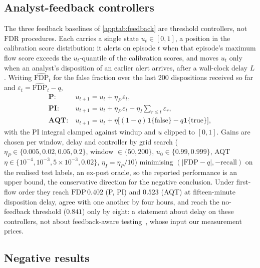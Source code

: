 \documentclass[conference]{IEEEtran}
\newcommand{\FDP}{\mathrm{FDP}}
\newcommand{\FDR}{\mathrm{FDR}}
\begin{document}
\subsection{Analyst-feedback controllers}

The three feedback baselines of \cref{apptab:feedback} are threshold controllers, not $\FDR$ procedures.
Each carries a single state $u_t\in[0,1]$, a position in the calibration score distribution: it alerts on
episode $t$ when that episode's maximum flow score exceeds the $u_t$-quantile of the calibration scores,
and moves $u_t$ only when an analyst's disposition of an earlier alert arrives, after a wall-clock delay
$L$. Writing $\widehat{\FDP}_t$ for the false fraction over the last 200 dispositions received so far and
$\varepsilon_t=\widehat{\FDP}_t-q$,
{\small\begin{align*}
\textbf{P:}\ &u_{t+1}=u_t+\eta_P\,\varepsilon_t,\\
\textbf{PI:}\ &u_{t+1}=u_t+\eta_P\,\varepsilon_t+\eta_I\textstyle\sum_{r\le t}\varepsilon_r,\\
\textbf{AQT:}\ &u_{t+1}=u_t+\eta\big[(1{-}q)\mathbf 1\{\text{false}\}-q\mathbf 1\{\text{true}\}\big],
\end{align*}}%
with the PI integral clamped against windup and $u$ clipped to $[0,1]$. Gains are chosen per window,
delay and controller by grid search ($\eta_P\in\{0.005,0.02,0.05,0.2\}$, window $\in\{50,200\}$,
$u_0\in\{0.99,0.999\}$, AQT $\eta\in\{10^{-4},10^{-3},5\times10^{-3},0.02\}$, $\eta_I=\eta_P/10$)
minimising $(\lvert\FDP-q\rvert,-\text{recall})$ on the realised test labels, an ex-post oracle, so the
reported performance is an upper bound, the conservative direction for the negative conclusion. Under
first-flow order they reach $\FDP\,0.402$ (P, PI) and $0.523$ (AQT) at fifteen-minute disposition delay,
agree with one another by four hours, and reach the no-feedback threshold ($0.841$) only by eight: a
statement about delay on these controllers, not about feedback-aware testing~\cite{lu2026gaif}, whose
input our measurement prices.




\subsection{Negative results}
\end{document}
